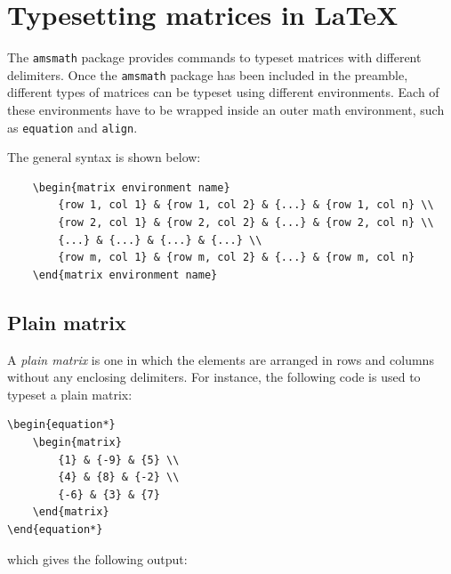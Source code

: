 \section{Typesetting matrices in \LaTeX}
	The \lstinline|amsmath| package provides commands to typeset matrices with different delimiters. Once the \lstinline|amsmath| package has been included in the preamble, different types of matrices can be typeset using different environments. Each of these environments have to be wrapped inside an outer math environment, such as \lstinline|equation| and \lstinline|align|.
	
	The general syntax is shown below:
\begin{lstlisting}
	\begin{matrix environment name}
		{row 1, col 1} & {row 1, col 2} & {...} & {row 1, col n} \\
		{row 2, col 1} & {row 2, col 2} & {...} & {row 2, col n} \\
		{...} & {...} & {...} & {...} \\
		{row m, col 1} & {row m, col 2} & {...} & {row m, col n}
	\end{matrix environment name}
\end{lstlisting}
	\subsection{Plain matrix}
		A \emph{plain matrix} is one in which the elements are arranged in rows and columns without any enclosing delimiters. For instance, the following code is used to typeset a plain matrix:
\begin{lstlisting}
\begin{equation*}
	\begin{matrix}
		{1} & {-9} & {5} \\
		{4} & {8} & {-2} \\
		{-6} & {3} & {7}
	\end{matrix}
\end{equation*}
\end{lstlisting}
		which gives the following output:
	
